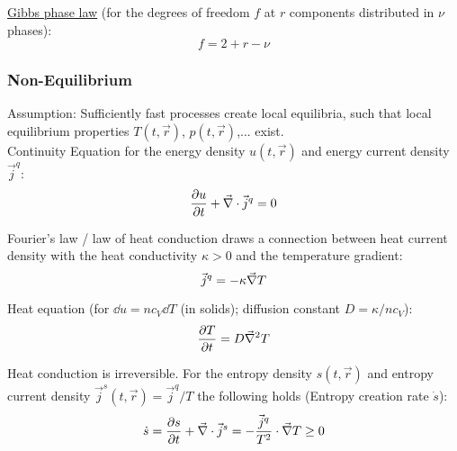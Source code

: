 			\noindent
			\href{https://en.wikipedia.org/wiki/Phase_rule}{Gibbs phase law} (for the degrees of freedom $f$ at $r$ components distributed in $\nu$ phases):
			\begin{equation}
				f = 2 + r - \nu
			\end{equation}

		\subsubsection{Non-Equilibrium}
			\noindent
			Assumption: Sufficiently fast processes create local equilibria, such that local equilibrium properties $T(t,\vec{r})$, $p(t,\vec{r})$,... exist. \\
			Continuity Equation for the energy density $u(t,\vec{r})$ and energy current density $\vec{j}^q$:
			\begin{equation}
				\frac{\partial u}{\partial t} + \vec{\nabla}\cdot\vec{j}^q = 0
			\end{equation}

			\noindent
			Fourier's law / law of heat conduction draws a connection between heat current density with the heat conductivity $\kappa >0$ and the temperature gradient:
			\begin{equation}
				\vec{j}^q = -\kappa \vec{\nabla} T
			\end{equation}

			\noindent
			Heat equation (for $\dd u = nc_V \dd T$ (\eg in solids); diffusion constant $D=\kappa/nc_V$):
			\begin{equation}
				\frac{\partial T}{\partial t} = D\vec{\nabla}^2 T
			\end{equation}

			\noindent
			Heat conduction is irreversible. For the entropy density $s(t,\vec{r})$ and entropy current density $\vec{j}^s (t,\vec{r}) = \vec{j}^q/T$ the following holds (Entropy creation rate $\dot{s}$):
			\begin{equation}
				\dot{s} = \frac{\partial s}{\partial t} + \vec{\nabla}\cdot\vec{j}^s = - \frac{\vec{j}^q}{T^2}\cdot\vec{\nabla} T \ge 0
			\end{equation}


